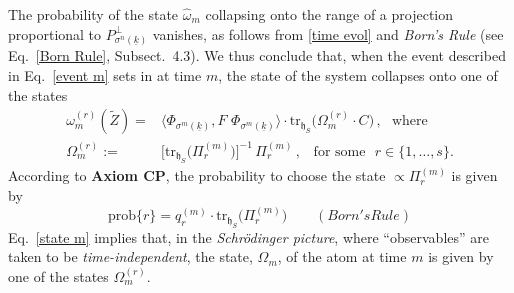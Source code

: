 \documentclass[a4paper,11pt]{article}
\begin{document}
The probability of the state $\widehat{\omega}_m$ collapsing onto the range of a projection proportional to 
$P_{\sigma^{n}(\underline{k})}^{\perp}$ vanishes, as follows from \eqref{time evol} and \textit{Born's Rule} 
(see Eq.~\eqref{Born Rule}, Subsect.~4.3). We thus conclude that, when the event described in 
Eq.~\eqref{event m} sets in at time $m$, the state of the system collapses onto one of the states
\begin{align}\label{state m}
\omega_{m}^{(r)}(\tilde{Z})=&  \langle \Phi_{\sigma^{m}(\underline{k})}, F\,\, \Phi_{\sigma^{m}(\underline{k})} \rangle \cdot 
\text{tr}_{\mathfrak{h}_S}\big(\Omega_{m}^{(r)} \cdot C\big)\,,\,\,\text{ where }\nonumber \\
\Omega_{m}^{(r)}:=&\big[\text{tr}_{\mathfrak{h}_S}\big(\Pi_{r}^{(m)}\big)\big]^{-1}\, \Pi_{r}^{(m)}\,, \,\,\, \text{ for some }\,\, 
r \in \big\{1, \dots, s\big\} .
\end{align}
According to {\bf{Axiom CP}}, the probability to choose the state $\propto \Pi_{r}^{(m)}$ is given by
$$\text{prob}\{r\}= q_{r}^{(m)} \cdot \text{tr}_{\mathfrak{h}_S}\big(\Pi_{r}^{(m)}\big)\qquad (Born's Rule)$$
Eq.~\eqref{state m} implies that, in the \textit{Schr\"odinger picture}, where ``observables'' are taken to 
be \textit{time-independent}, the state, $\Omega_m$, of the atom at time $m$ is given by one of the states 
$\Omega_{m}^{(r)}$. 
\end{document}
